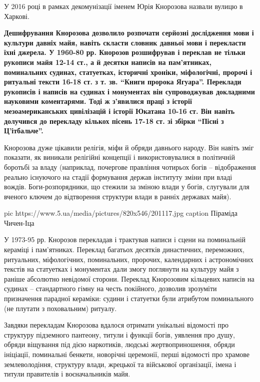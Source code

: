 У 2016 році в рамках декомунізації іменем Юрія Кнорозова назвали вулицю в
Харкові.

\begin{leftbar}
\bfseries
Дешифрування Кнорозова дозволило розпочати серйозні дослідження мови і
культури давніх майя, навіть скласти словник давньої мови і перекласти
їхні джерела. У 1960-80 рр. Кнорозов розшифрував і переклав не тільки
рукописи майя 12-14 ст., а й десятки написів на пам'ятниках, поминальних
судинах, статуетках, історичні хроніки, міфологічні, пророчі і ритуальні
тексти 16-18 ст. з т. зв. \enquote{Книги пророка Ягуара}. Переклади рукописів і
написів на судинах і монументах він супроводжував докладними науковими
коментарями. Тоді ж з'явилися праці з історії мезоамериканських
цивілізацій і історії Юкатана 10-16 ст. Він навіть долучився до
перекладу кількох пісень 17-18 ст. зі збірки \enquote{Пісні з Ц'ітбальче}.
\end{leftbar}

Кнорозова дуже цікавили релігія, міфи й обряди давнього народу. Він навіть
зміг показати, як виникали релігійні концепції і використовувалися в
політичній боротьбі за владу (наприклад, почергове правління чотирьох
богів – відображення реально існуючого на стадії формування держав
інституту зміни при владі вождів. Боги-розпорядники, що стежили за зміною
влади у богів, слугували для вченого ключем до відтворення структури влади
в ранніх державах майя).

\ifcmt
pic https://www.5.ua/media/pictures/820x546/201117.jpg
caption Піраміда Чичен-Іца
\fi

У 1973-95 рр. Кнорозов перекладав і трактував написи і сцени на
поминальній кераміці і пам'ятниках. Переклад багатьох десятків
династичних, переможних, ритуальних, міфологічних, поминальних, пророчих,
календарних і астрономічних текстів на статуетках і монументах дали змогу
поглянути на культуру майя з раніше абсолютно невідомої сторони. Переклад
Кнорозовим кільцевих написів на судинах – стандартного гімну на честь
покійного, дозволив зрозуміти призначення парадної кераміки: судини і
статуетки були атрибутом поминального (не плутати з поховальним) ритуалу.

Завдяки перекладам Кнорозова вдалося отримати унікальні відомості про
структуру підземного пантеону, титули і функції богів, уявлення про душу,
обряди віщування під дією наркотиків, людські жертвоприношення, обряди
ініціації, поминальні бенкети, новорічні церемонії, перші відомості про
храмове землеволодіння, структуру влади, жрецької та військової
організації, імена і титули правителів і воєначальників майя.

